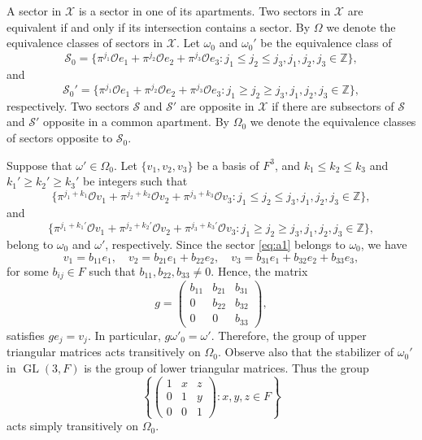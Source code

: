 \documentclass[a4paper]{amsart}
\newcommand{\GL}{\operatorname{GL}}
\newcommand{\ZZ}{\mathbb{Z}}
\newcommand{\calO}{\mathcal{O}}
\theoremstyle{plain}
\theoremstyle{definition}
\theoremstyle{remark}
\numberwithin{equation}{section}
\theoremstyle{plain}
\begin{document}
	A sector in $\mathscr{X}$ is a sector in one of its apartments. Two sectors in $\mathscr{X}$ are equivalent
	if and only if its intersection contains a sector. By $\Omega$ we denote the equivalence classes of sectors in 
	$\mathscr{X}$. Let $\omega_0$ and $\omega_0'$ be the equivalence class of
	\[
		\mathscr{S}_0 = \big\{\pi^{j_1} \calO e_1 + \pi^{j_2} \calO e_2 + \pi^{j_3} \calO e_3 :
        j_1 \leq j_2 \leq j_3, j_1, j_2, j_3 \in \ZZ \big\},
	\]
	and
	\[
		\mathscr{S}_0' = \big\{\pi^{j_1} \calO e_1 + \pi^{j_2} \calO e_2 + \pi^{j_3} \calO e_3 :
        j_1 \geq j_2 \geq j_3, j_1, j_2, j_3 \in \ZZ \big\},
	\]
	respectively. Two sectors $\mathscr{S}$ and $\mathscr{S}'$ are opposite in $\mathscr{X}$ if there are subsectors of
	$\mathscr{S}$ and $\mathscr{S}'$ opposite in a common apartment. By $\Omega_0$ we denote the equivalence classes
	of sectors opposite to $\mathscr{S}_0$. 

	Suppose that $\omega' \in \Omega_0$. Let $\{v_1, v_2, v_3\}$ be a basis of $F^3$, and $k_1 \leq k_2 \leq k_3$ and
	$k_1' \geq k_2' \geq k_3'$ be integers such that
	\begin{equation}
		\label{eq:a1}
		\big\{\pi^{j_1 + k_1} \calO v_1 + \pi^{j_2 + k_2} \calO v_2 + \pi^{j_3 + k_3} \calO v_3 : 
		j_1 \leq j_2 \leq j_3, j_1, j_2, j_3 \in \ZZ\big\},
	\end{equation}
	and
	\begin{equation}
		\label{eq:a2}
		\big\{\pi^{j_1 + k_1'} \calO v_1 + \pi^{j_2 + k_2'} \calO v_2 + \pi^{j_3 + k_3'} \calO v_3 :
        j_1 \geq j_2 \geq j_3, j_1, j_2, j_3 \in \ZZ\big\},
	\end{equation}
	belong to $\omega_0$ and $\omega'$, respectively. Since the sector \eqref{eq:a1} belongs to $\omega_0$, we have
	\[
		v_1 = b_{11} e_1, \quad
		v_2 = b_{21} e_1 + b_{22} e_2, \quad
		v_3 = b_{31} e_1 + b_{32} e_2 + b_{33} e_3,
	\]
	for some $b_{ij} \in F$ such that $b_{11}, b_{22}, b_{33} \neq 0$. Hence, the matrix
	\[
		g = 
		\begin{pmatrix}
			b_{11} & b_{21} & b_{31} \\
			0 & b_{22} & b_{32} \\
			0 & 0 & b_{33}
		\end{pmatrix},
	\]
	satisfies $g e_j = v_j$. In particular, $g\omega'_0 = \omega'$. Therefore, the group of upper triangular matrices acts
	transitively on $\Omega_0$. Observe also that the stabilizer of $\omega_0'$ in $\GL(3, F)$ is
	the group of lower triangular matrices. Thus the group
	\[
		\left\{
		\begin{pmatrix}
		1 & x & z \\
		0 & 1 & y \\
		0 & 0 & 1
		\end{pmatrix} :
		x, y, z \in F
		\right\}
	\]
	acts simply transitively on $\Omega_0$.
\end{document}
